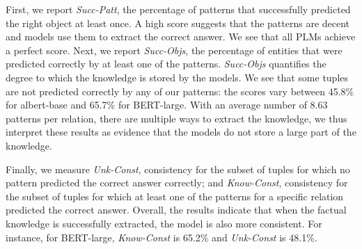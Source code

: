 First, we report \emph{Succ-Patt}, the percentage of
patterns that successfully predicted the right object at
least once. A high score  suggests that the patterns are
decent and models use  them to extract the correct
answer. We see that all PLMs achieve a perfect score.
Next, we report
\emph{Succ-Objs},
the percentage of entities that were predicted correctly by at least one of the patterns.
\textit{Succ-Objs} quantifies the degree to which the knowledge is stored by the models.
We see that some tuples are not predicted correctly by any of our patterns: the scores vary between 45.8\% for albert-base and 65.7\% for BERT-large. %
With an average number of 8.63 patterns per relation, there
are multiple ways to extract the knowledge, we thus interpret
these results as evidence that the models do not store a large part  of the
\resource{} knowledge. 


Finally, we measure \emph{Unk-Const}, consistency  for the subset of tuples
for which no pattern predicted the correct answer correctly;
and \emph{Know-Const},
consistency for the subset of tuples for which
at least one of the patterns for a specific
relation predicted the correct answer.
Overall, the results indicate that when the factual knowledge is successfully extracted, the model is also more consistent.
For instance, for BERT-large, \textit{Know-Const}  is 65.2\% and \textit{Unk-Const} is 48.1\%. 


